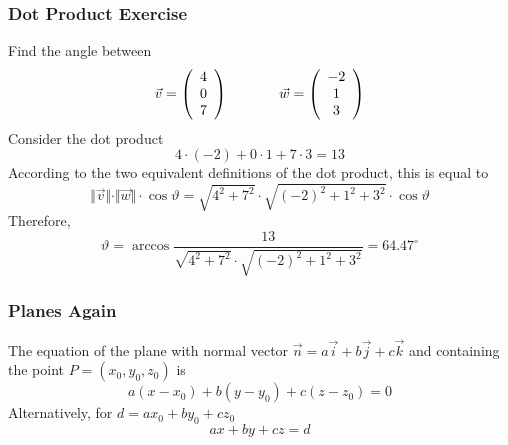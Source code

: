 \documentclass[xcolor=dvipsnames]{beamer}
\begin{document}
\begin{frame}
  \frametitle{Dot Product Exercise}
  {\ubung} Find the angle between
  \begin{equation}
    \label{eq:tauhohju}
    \vec{v}=\left(
      \begin{array}{c}
        4 \\
        0 \\
        7
      \end{array}\right)\hspace{.5in}\vec{w}=\left(
      \begin{array}{c}
        -2 \\
        1 \\
        3
      \end{array}\right)
  \end{equation}
  Consider the dot product
  \begin{equation}
    \label{eq:ijaquahd}
    4\cdot(-2)+0\cdot{}1+7\cdot{}3=13
  \end{equation}
According to the two equivalent definitions of the dot product, this
is equal to
\begin{equation}
  \label{eq:ohyizaeb}
  \Vert\vec{v}\Vert\cdot\Vert\vec{w}\Vert\cdot\cos\vartheta=\sqrt{4^{2}+7^{2}}\cdot\sqrt{(-2)^{2}+1^{2}+3^{2}}\cdot\cos\vartheta
\end{equation}
Therefore,
\begin{equation}
  \label{eq:yohsheen}
  \vartheta=\arccos\frac{13}{\sqrt{4^{2}+7^{2}}\cdot\sqrt{(-2)^{2}+1^{2}+3^{2}}}=64.47^{\circ}
\end{equation}
\end{frame}

\begin{frame}
  \frametitle{Planes Again}
  The equation of the plane with normal vector
  $\vec{n}=a\vec{i}+b\vec{j}+c\vec{k}$ and containing the point
  $P=(x_{0},y_{0},z_{0})$ is
  \begin{equation}
    \label{eq:ijaeriri}
    a(x-x_{0})+b(y-y_{0})+c(z-z_{0})=0
  \end{equation}
  Alternatively, for $d=ax_{0}+by_{0}+cz_{0}$
  \begin{equation}
    \label{eq:bamoyeez}
    ax+by+cz=d
  \end{equation}
\end{frame}
\end{document}
